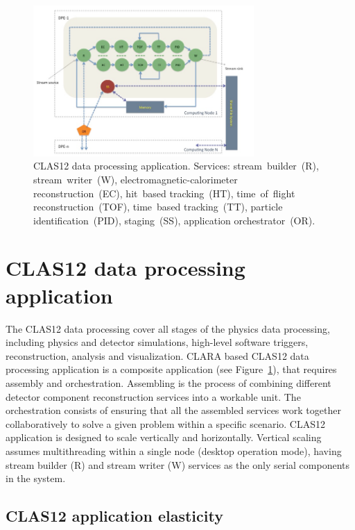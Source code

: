 \documentclass[a4paper]{jpconf}
\begin{document}
\begin{figure}[!h]
  \begin{center}
    \includegraphics[width=0.75\textwidth]{figures/clas-rec}
  \end{center}
  \caption{CLAS12 data processing application.
    Services:
    stream~builder~(R),
    stream~writer~(W),
    electromagnetic-calorimeter reconstruction~(EC),
    hit~based tracking~(HT),
    time~of~flight reconstruction~(TOF),
    time~based tracking~(TT),
    particle identification~(PID),
    staging~(SS),
  application orchestrator~(OR).}
  \label{fig:clasrec}
\end{figure}

\section{CLAS12 data processing application}

The CLAS12 data processing cover all stages of the physics data processing,
including physics and detector simulations, high-level software triggers,
reconstruction, analysis and visualization.
CLARA based CLAS12 data processing application is a composite application
(see Figure~\ref{fig:clasrec}),
that requires assembly and orchestration.
Assembling is the process of combining different detector component
reconstruction services into a workable unit.
The orchestration consists of ensuring that all the assembled services work
together collaboratively to solve a given problem within a specific scenario.
CLAS12 application is designed to scale vertically and horizontally.
Vertical scaling assumes multithreading
within a single node (desktop operation mode),
having stream builder (R) and stream writer (W) services
as the only serial components in the system.

\subsection{CLAS12 application elasticity}
\end{document}

